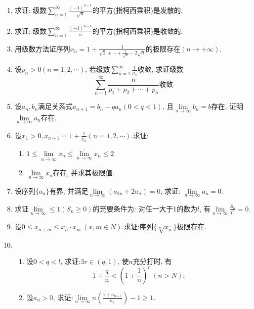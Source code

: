 \begin{enumerate}
\begin{enumerate}
\end{enumerate}
\item 求证: 级数$\sum\limits_{n=1}^{\infty}\frac{(-1)^{n-1}}{\sqrt{n}}$的平方(指柯西乘积)是发散的.
\item 求证: 级数$\sum\limits_{n=1}^{\infty}\frac{(-1)^{n-1}}{n}$的平方(指柯西乘积)是收敛的.
\item 用级数方法证序列$x_n=1+\frac{1}{\sqrt{2}+\cdots+\frac{1}{\sqrt{n}}-2\sqrt{n}}$的极限存在$(n\rightarrow +\infty)$.
\item 设$p_n>0(n=1,2,\cdots)$, 若级数$\sum\limits_{n=1}^{\infty}\frac{1}{p_n}$收敛, 求证级数
$$ \sum\limits_{n=1}^{\infty}\frac{n}{p_1+p_2+\cdots+p_n}\textbf{收敛}$$
\item 设${a_n},{b_n}$满足关系式$a_{n+1}=b_n-qa_n(0<q<1)$, 且$\lim\limits_{n\rightarrow \infty}b_n=b$存在, 证明$\lim\limits_{n\rightarrow \infty}a_n$存在.
\item 设$x_1>0,x_{n+1}=1+\frac{1}{x_n}(n=1,2,\cdots)$.求证:
\begin{enumerate}
	\item $1\le \underset{n\rightarrow \infty}{\underline{\lim}}x_n\le \overline{\lim\limits_{n\rightarrow \infty}}x_n\le 2$
	\item $\lim\limits_{n\rightarrow \infty}x_n$存在, 并求其极限值.
\end{enumerate}
\item 设序列$\{a_n\}$有界, 并满足$\lim\limits_{n\rightarrow \infty}(a_{2n}+2a_n)=0$, 求证: $\lim\limits_{n\rightarrow \infty}a_n=0$.
\item 求证$\overline{\lim\limits_{n\rightarrow \infty}}\le 1(S_n\ge 0)$的充要条件为: 对任一大于1的数为$l$, 有$\lim\limits_{n\rightarrow \infty}\frac{S_n}{l^n}=0$.
\item 设$0\le x_{n+m}\le x_n \cdot x_m\ (x,m\in N)$.求证:序列$\{\sqrt[n]{x_n}\}$极限存在.
\item 
\begin{enumerate}
	\item 设$0<q<l$, 求证:$\exists r\in (q,1)$, 使$n$充分打时, 有$$
	1+\frac{q}{n}<(1+\frac{1}{n})^r\ (n>N);
	$$
	\item 设$a_n>0$, 求证:$\overline{\lim\limits_{n\rightarrow \infty}}n(\frac{1+a_{n+1}}{a_n})-1\ge 1$.
\end{enumerate}
\end{enumerate}

